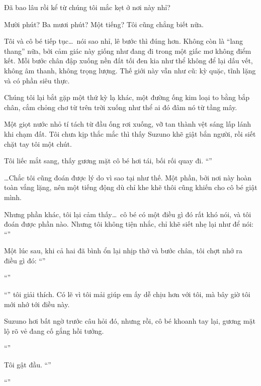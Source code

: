 \documentclass[../main.tex]{subfiles}
\begin{document}

Đã bao lâu rồi kể từ chúng tôi mắc kẹt ở nơi này nhỉ?

Mười phút? Ba mươi phút? Một tiếng? Tôi cũng chẳng biết nữa.

Tôi và cô bé tiếp tục\dots\ nói sao nhỉ, lê bước thì đúng hơn. Không còn là ``lang thang'' nữa, bởi cảm giác này giống như đang đi trong một giấc mơ không điểm kết. Mỗi bước chân đập xuống nền đất tối đen kia như thể không để lại dấu vết, không âm thanh, không trọng lượng. Thế giới này vẫn như cũ: kỳ quặc, tĩnh lặng và có phần siêu thực.

Chúng tôi lại bắt gặp một thứ kỳ lạ khác, một đường ống kim loại to bằng bắp chân, cắm chỏng chơ từ trên trời xuống như thể ai đó đâm nó từ tầng mây.

Một giọt nước nhỏ tí tách từ đầu ống rơi xuống, vỡ tan thành vệt sáng lấp lánh khi chạm đất. Tôi chưa kịp thắc mắc thì thấy Suzuno khẽ giật bắn người, rồi siết chặt tay tôi một chút.

Tôi liếc mắt sang, thấy gương mặt cô bé hơi tái, bối rối quay đi. ``''

\dots Chắc tôi cũng đoán được lý do vì sao tại như thế. Một phần, bởi nơi này hoàn toàn vắng lặng, nên một tiếng động dù chỉ khe khẽ thôi cũng khiến cho cô bé giật mình.

Nhưng phần khác, tôi lại cảm thấy\dots\ cô bé có một điều gì đó rất khó nói, và tôi đoán được phần nào. Nhưng tôi không tiện nhắc, chỉ khẽ siết nhẹ lại như để nói: ``''

Một lúc sau, khi cả hai đã bình ổn lại nhịp thở và bước chân, tôi chợt nhớ ra điều gì đó: ``''

``''

``'' tôi giải thích. Có lẽ vì tôi mải giúp em ấy dễ chịu hơn với tôi, mà bây giờ tôi mới nhớ tới điều này.

Suzuno hơi bất ngờ trước câu hỏi đó, nhưng rồi, cô bé khoanh tay lại, gương mặt lộ rõ vẻ đang cố gắng hồi tưởng.

``''

Tôi gật đầu. ``''

``''
\end{document}
